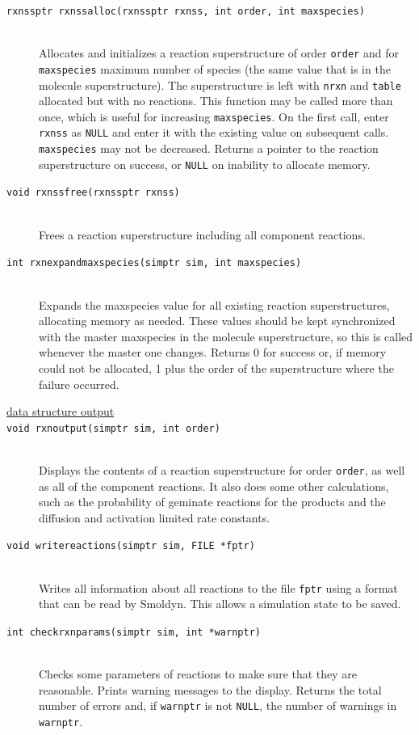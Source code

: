 \documentclass {scrbook}
\newcommand {\ttt} {\texttt}
\begin{document}
\begin{description}
\item[\ttt{rxnssptr rxnssalloc(rxnssptr rxnss, int order, int maxspecies)}]
\hfill \\
Allocates and initializes a reaction superstructure of order \ttt{order} and for \ttt{maxspecies} maximum number of species (the same value that is in the molecule superstructure). The superstructure is left with \ttt{nrxn} and \ttt{table} allocated but with no reactions. This function may be called more than once, which is useful for increasing \ttt{maxspecies}. On the first call, enter \ttt{rxnss} as \ttt{NULL} and enter it with the existing value on subsequent calls. \ttt{maxspecies} may not be decreased. Returns a pointer to the reaction superstructure on success, or \ttt{NULL} on inability to allocate memory.

\item[\ttt{void rxnssfree(rxnssptr rxnss)}]
\hfill \\
Frees a reaction superstructure including all component reactions.

\item[\ttt{int rxnexpandmaxspecies(simptr sim, int maxspecies)}]
\hfill \\
Expands the maxspecies value for all existing reaction superstructures, allocating memory as needed. These values should be kept synchronized with the master maxspecies in the molecule superstructure, so this is called whenever the master one changes. Returns 0 for success or, if memory could not be allocated, 1 plus the order of the superstructure where the failure occurred.

\item[\underline{data structure output}]

\item[\ttt{void rxnoutput(simptr sim, int order)}]
\hfill \\
Displays the contents of a reaction superstructure for order \ttt{order}, as well as all of the component reactions. It also does some other calculations, such as the probability of geminate reactions for the products and the diffusion and activation limited rate constants.

\item[\ttt{void writereactions(simptr sim, FILE *fptr)}]
\hfill \\
Writes all information about all reactions to the file \ttt{fptr} using a format that can be read by Smoldyn. This allows a simulation state to be saved.

\item[\ttt{int checkrxnparams(simptr sim, int *warnptr)}]
\hfill \\
Checks some parameters of reactions to make sure that they are reasonable. Prints warning messages to the display. Returns the total number of errors and, if \ttt{warnptr} is not \ttt{NULL}, the number of warnings in \ttt{warnptr}.


\end{description}
\end{document}
